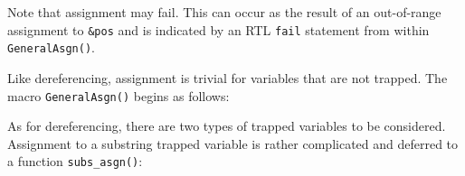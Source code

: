 \goodbreak
{}

Note that assignment may fail. This can occur as the result of an
out-of-range assignment to \texttt{\&pos} and is indicated by an RTL
\texttt{fail} statement from within \texttt{GeneralAsgn()}.

Like dereferencing, assignment is trivial for variables that are not
trapped. The macro \texttt{GeneralAsgn()} begins as follows:

\goodbreak
{}

As for dereferencing, there are two types of trapped variables to be
considered. Assignment to a substring trapped variable is rather
complicated and deferred to a function \texttt{subs\_asgn()}:

